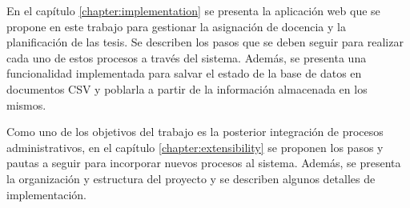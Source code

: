 En el capítulo \ref{chapter:implementation} se presenta 
la aplicación web que se propone en este trabajo para gestionar la 
asignación de docencia y la planificación de las tesis. Se describen 
los pasos que se deben seguir para realizar cada uno de estos procesos 
a través del sistema. Además, se presenta una funcionalidad implementada 
para salvar el estado de la base de datos en documentos CSV y poblarla 
a partir de la información almacenada en los mismos. 

Como uno de los objetivos del trabajo es la posterior integración de procesos 
administrativos, en el capítulo \ref{chapter:extensibility}
se proponen los pasos y pautas a seguir para incorporar nuevos procesos al 
sistema. Además, se presenta la organización y estructura del 
proyecto y se describen algunos detalles de implementación. 




